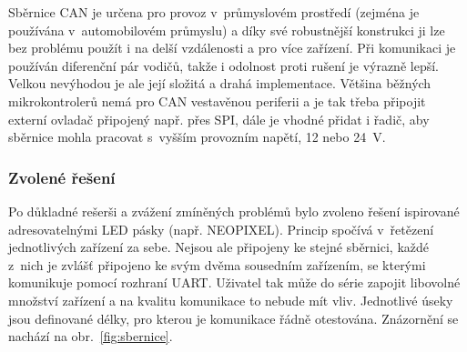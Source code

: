         Sběrnice CAN je určena pro provoz v~průmyslovém prostředí (zejména je používána v~automobilovém průmyslu) a díky své robustnější konstrukci ji lze bez problému použít i na delší vzdálenosti a pro více zařízení. Při komunikaci je používán diferenční pár vodičů, takže i odolnost proti rušení je výrazně lepší. Velkou nevýhodou je ale její složitá a drahá implementace. Většina běžných mikrokontrolerů nemá pro CAN vestavěnou periferii a je tak třeba připojit externí ovladač připojený např. přes SPI, dále je vhodné přidat i řadič, aby sběrnice mohla pracovat s~vyšším provozním napětí, 12 nebo \qty{24}{V}. 

    \subsubsection{Zvolené řešení}
        Po důkladné rešerši a zvážení zmíněných problémů bylo zvoleno řešení ispirované adresovatelnými LED pásky (např. NEOPIXEL). Princip spočívá v~řetězení jednotlivých zařízení za sebe. Nejsou ale připojeny ke stejné sběrnici, každé z~nich je zvlášť připojeno ke svým dvěma sousedním zařízením, se kterými komunikuje pomocí rozhraní UART. Uživatel tak může do série zapojit libovolné množství zařízení a na kvalitu komunikace to nebude mít vliv. Jednotlivé úseky jsou definované délky, pro kterou je komunikace řádně otestována. Znázornění se nachází na obr.~\ref{fig:sbernice}.

